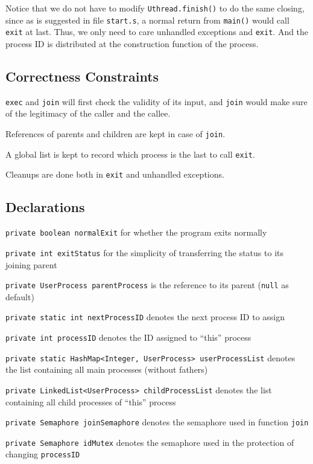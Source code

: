 \documentclass{article}
\begin{document}
\begin{spacing}{1.1}
Notice that we do not have to modify \texttt{Uthread.finish()} to do the same closing, since as is suggested in file \texttt{start.s}, a normal return from \texttt{main()} would call \texttt{exit} at last. Thus, we only need to care unhandled exceptions and \texttt{exit}. And the process ID is distributed at the construction function of the process.
\subsection{Correctness Constraints}
\begin{asparaitem}
  \item \texttt{exec} and \texttt{join} will first check the validity of its input, and \texttt{join} would make sure of the legitimacy of the caller and the callee.
  \item References of parents and children are kept in case of \texttt{join}.
  \item A global list is kept to record which process is the last to call \texttt{exit}.
  \item Cleanups are done both in \texttt{exit} and unhandled exceptions.
\end{asparaitem}
\subsection{Declarations}
\texttt{private boolean normalExit} for whether the program exits normally

\texttt{private int exitStatus} for the simplicity of transferring the status to its joining parent

\texttt{private UserProcess parentProcess} is the reference to its parent (\texttt{null} as default)

\texttt{private static int nextProcessID} denotes the next process ID to assign

\texttt{private int processID} denotes the ID assigned to ``this'' process

\texttt{private static HashMap<Integer, UserProcess> userProcessList} denotes the list containing all main processes (without fathers)

\texttt{private LinkedList<UserProcess> childProcessList} denotes the list containing all child processes of ``this'' process

\texttt{private Semaphore joinSemaphore} denotes the semaphore used in function \texttt{join}

\texttt{private Semaphore idMutex} denotes the semaphore used in the protection of changing \texttt{processID}


\end{spacing}
\end{document}
